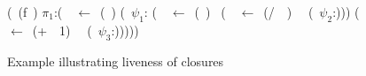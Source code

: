 \begin{figure}[t]
{%
  \renewcommand{\arraystretch}{.8}{
    \begin{uprogram}
      \UFL (\DEFINE~(f~\px)
       $\pi_1$:(\LET~\py~$\leftarrow $\
      (\length~\px) \IN
       (\SIF~$\psi_1$:\py
      (\LET~\pu~$\leftarrow$~(\Sum~\px)~\IN
       (\LET~\pw~$\leftarrow$\ (/~\pu~\py)~\IN\  (\SRETURN~$\psi_2$:\pw)))
      \UNL{5}(\LET~\pz~$\leftarrow$~(+~\py~1)~\IN\ \UNL{6} (\SRETURN~$\psi_3$:\pz)))))   
  \end{uprogram}}
}
\caption{Example illustrating liveness of closures}\label{fig:lv-closure}
\vspace*{.1cm}
\end{figure}
